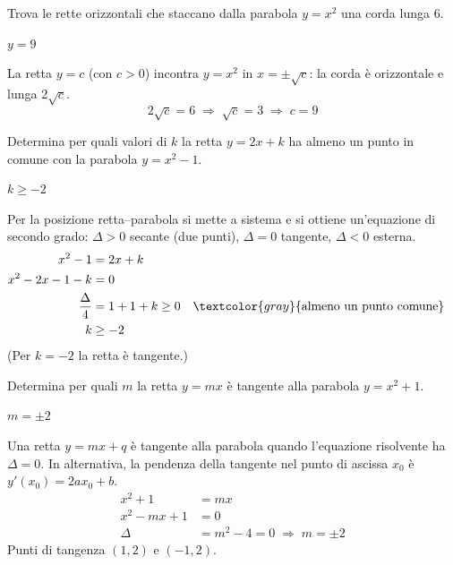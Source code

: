 
\begin{question}[ID=2.5, subtitle={Rette orizzontali con corda di lunghezza 6 su $y=x^2$}, difficulty=media, tags={parabola, corda}]
Trova le rette orizzontali che staccano dalla parabola $y=x^2$ una corda lunga $6$.
\begin{solution}
$y=9$
\end{solution}
\begin{explanation}
La retta $y=c$ (con $c>0$) incontra $y=x^2$ in $x=\pm\sqrt c$: la corda è orizzontale e lunga $2\sqrt c$.
\[ 2\sqrt c=6 \;\Rightarrow\; \sqrt c=3 \;\Rightarrow\; c=9 \]
\end{explanation}
\end{question}


\begin{question}[ID=2.6, subtitle={Valori di $k$ per intersezione di $y=2x+k$ con $y=x^2-1$}, difficulty=media, tags={parabola, parametrico}]
Determina per quali valori di $k$ la retta $y=2x+k$ ha almeno un punto in comune con la parabola $y=x^2-1$.
\begin{solution}
$k\geq-2$
\end{solution}
\begin{explanation}
Per la posizione retta–parabola si mette a sistema e si ottiene un'equazione di secondo grado: $\Delta>0$ secante (due punti), $\Delta=0$ tangente, $\Delta<0$ esterna.
\[\begin{aligned}
x^2-1 &= 2x+k\\
x^2-2x-1-k &= 0\\
\dfrac\Delta4 &= 1+1+k\geq0 && \textcolor{gray}{\text{almeno un punto comune}}\\
k &\geq -2
\end{aligned}\]
(Per $k=-2$ la retta è tangente.)
\end{explanation}
\end{question}


\begin{question}[ID=2.7, subtitle={Valori di $m$ per cui $y=mx$ è tangente a $y=x^2+1$}, difficulty=media, tags={parabola, parametrico, tangenza}]
Determina per quali $m$ la retta $y=mx$ è tangente alla parabola $y=x^2+1$.
\begin{solution}
$m=\pm2$
\end{solution}
\begin{explanation}
Una retta $y=mx+q$ è tangente alla parabola quando l'equazione risolvente ha $\Delta=0$. In alternativa, la pendenza della tangente nel punto di ascissa $x_0$ è $y'(x_0)=2ax_0+b$.
\[\begin{aligned}
x^2+1 &= mx\\
x^2-mx+1 &= 0\\
\Delta &= m^2-4=0 \;\Rightarrow\; m=\pm2
\end{aligned}\]
Punti di tangenza $(1,2)$ e $(-1,2)$.
\end{explanation}
\end{question}


